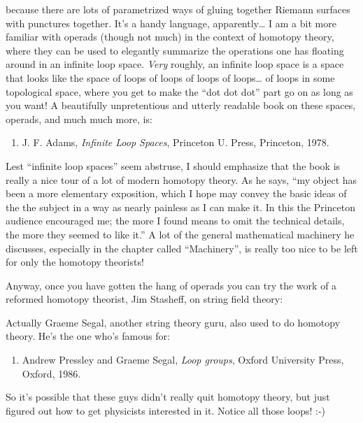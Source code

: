 \documentclass{article}
\def\tightlist{}
\renewcommand{\texttt}[1]{%
  \begingroup
  \ttfamily
  \begingroup\lccode`~=`/\lowercase{\endgroup\def~}{/\discretionary{}{}{}}%
  \begingroup\lccode`~=`[\lowercase{\endgroup\def~}{[\discretionary{}{}{}}%
  \begingroup\lccode`~=`.\lowercase{\endgroup\def~}{.\discretionary{}{}{}}%
  \catcode`/=\active\catcode`[=\active\catcode`.=\active
  \scantokens{#1\noexpand}%
  \endgroup
}
\begin{document}
because there are lots of parametrized ways of gluing together Riemann
surfaces with punctures together. It's a handy language,
apparently\ldots{} I am a bit more familiar with operads (though not
much) in the context of homotopy theory, where they can be used to
elegantly summarize the operations one has floating around in an
infinite loop space. \emph{Very} roughly, an infinite loop space is a
space that looks like the space of loops of loops of loops of
loops\ldots{} of loops in some topological space, where you get to make
the ``dot dot dot'' part go on as long as you want! A beautifully
unpretentious and utterly readable book on these spaces, operads, and
much much more, is:

\begin{enumerate}
\def\labelenumi{\arabic{enumi})}
\setcounter{enumi}{6}
\tightlist
\item
  J. F. Adams, \emph{Infinite Loop Spaces}, Princeton U. Press,
  Princeton, 1978.
\end{enumerate}

Lest ``infinite loop spaces'' seem abstruse, I should emphasize that the
book is really a nice tour of a lot of modern homotopy theory. As he
says, ``my object has been a more elementary exposition, which I hope
may convey the basic ideas of the the subject in a way as nearly
painless as I can make it. In this the Princeton audience encouraged me;
the more I found means to omit the technical details, the more they
seemed to like it.'' A lot of the general mathematical machinery he
discusses, especially in the chapter called ``Machinery'', is really too
nice to be left for only the homotopy theorists!

Anyway, once you have gotten the hang of operads you can try the work of
a reformed homotopy theorist, Jim Stasheff, on string field theory:

\noindent
Actually Graeme Segal, another string theory guru, also used to do
homotopy theory. He's the one who's famous for:

\begin{enumerate}
\def\labelenumi{\arabic{enumi})}
\setcounter{enumi}{8}
\tightlist
\item
  Andrew Pressley and Graeme Segal, \emph{Loop groups}, Oxford
  University Press, Oxford, 1986.
\end{enumerate}
\noindent
So it's possible that these guys didn't really quit homotopy theory, but
just figured out how to get physicists interested in it. Notice all
those loops! :-)
\end{document}
